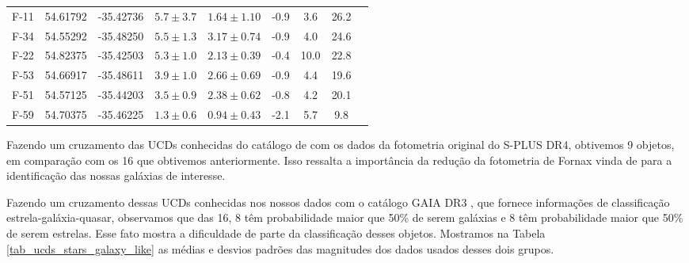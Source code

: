 \begin{table}[!ht]
\begin{tabular}{lcccccccc}
        F-11       & 54.61792 & -35.42736 & $5.7 \pm 3.7$   & $1.64 \pm 1.10$ & -0.9 & 3.6  & 26.2 \\
        F-34       & 54.55292 & -35.48250 & $5.5 \pm 1.3$   & $3.17 \pm 0.74$ & -0.9 & 4.0  & 24.6 \\
        F-22       & 54.82375 & -35.42503 & $5.3 \pm 1.0$   & $2.13 \pm 0.39$ & -0.4 & 10.0 & 22.8 \\
        F-53       & 54.66917 & -35.48611 & $3.9 \pm 1.0$   & $2.66 \pm 0.69$ & -0.9 & 4.4  & 19.6 \\
        F-51       & 54.57125 & -35.44203 & $3.5 \pm 0.9$   & $2.38 \pm 0.62$ & -0.8 & 4.2  & 20.1 \\
        F-59       & 54.70375 & -35.46225 & $1.3 \pm 0.6$   & $0.94 \pm 0.43$ & -2.1 & 5.7  & 9.8  \\
        \bottomrule
    \end{tabular}
    \label{ucds_fornax_propriedades}
\end{table}

Fazendo um cruzamento das UCDs conhecidas do catálogo de \cite{catalog_ucds} com os dados da fotometria original do S-PLUS DR4, obtivemos 9 objetos, em comparação com os 16 que obtivemos anteriormente. Isso ressalta a importância da redução da fotometria de Fornax vinda de \cite{haack2024splusfornaxprojectsfp} para a identificação das nossas galáxias de interesse.

Fazendo um cruzamento dessas UCDs conhecidas nos nossos dados com o catálogo GAIA DR3 \citep{GAIA_DR3}, que fornece informações de classificação estrela-galáxia-quasar, observamos que das 16, 8 têm probabilidade maior que 50\% de serem galáxias e 8 têm probabilidade maior que 50\% de serem estrelas. Esse fato mostra a dificuldade de parte da classificação desses objetos. Mostramos na Tabela \ref{tab_ucds_stars_galaxy_like} as médias e desvios padrões das magnitudes dos dados usados desses dois grupos.

